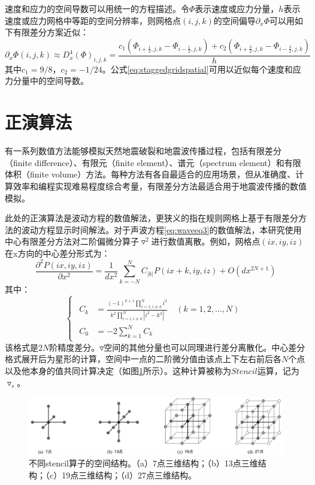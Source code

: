 \documentclass[degree=doctor]{thuthesis}
\begin{document}
速度和应力的空间导数可以用统一的方程描述。令$\Phi$表示速度或应力分量，$h$表示速度或应力网格中等距的空间分辨率，则网格点$(i,j,k)$的空间偏导$\partial_x \Phi$可以用如下有限差分方案近似：
\begin{equation}
  \partial_x \Phi(i,j,k) \approx D_x^4(\Phi)_{i,j,k} = \frac{c_1\left(\Phi_{i+\frac{1}{2},j,k} - \Phi_{i-\frac{1}{2},j,k}\right)+ c_2\left(\Phi_{i+\frac{3}{2},j,k} - \Phi_{i-\frac{3}{2},j,k}\right)}{h}
  \label{eq:staggedgridspatial}
\end{equation}
其中$c_1=9/8$，$c_2=-1/24$。公式\ref{eq:staggedgridspatial}可用以近似每个速度和应力分量中的空间导数。

\section{正演算法} %
有一系列数值方法能够模拟天然地震破裂和地震波传播过程，包括有限差分（finite difference）、有限元（finite element）、谱元（spectrum element）和有限体积（finite volume）方法。每种方法有各自最适合的应用场景，但从准确度、计算效率和编程实现难易程度综合考量，有限差分方法最适合用于地震波传播的数值模拟。

此处的正演算法是波动方程的数值解法，更狭义的指在规则网格上基于有限差分方法的波动方程显示时间解法。对于声波方程\ref{eq:waveeq3}的数值解法，本研究使用中心有限差分方法对二阶偏微分算子$\triangledown ^2$进行数值离散。例如，网格点$(ix, iy, iz)$在x方向的中心差分形式为：
\begin{equation}
  \frac{\partial ^2 P(ix, iy, iz)}{\partial x^2}=\frac{1}{dx^2}\sum_{k=-N}^N C_{|k|}P(ix+k, iy, iz)+O(dx^{2N+1})
\end{equation}
其中：
\begin{equation}
\left\{\begin{matrix}
\begin{aligned}
C_k &=\frac{(-1)^{k+1}\prod_{i=1,i\neq k}^N i^2}{k^2\prod_{i=i,i\neq k}^N |i^2-k^2|}\quad (k=1,2,\ldots,N) \\
C_0 &=-2\sum_{k=1}^N C_k  
\end{aligned}
\end{matrix}\right.
\end{equation}
该格式是$2N$阶精度差分。$\triangledown$空间的其他分量也可以同理进行差分离散化。中心差分格式展开后为星形的计算，空间中一点的二阶微分值由该点上下左右前后各$N$个点以及他本身的值共同计算决定（如图\ref{fig:stencilstruct}所示）。这种计算被称为$Stencil$运算，记为$\triangledown_s$。

\begin{figure}[ht]
  \centering
  \includegraphics[width=0.9\columnwidth]{stencil7131927.pdf}
  \caption{不同stencil算子的空间结构\cite{zhang2013autogeneration}。（a）7点三维结构；（b）13点三维结构；（c）19点三维结构；（d）27点三维结构。}
  \label{fig:stencilstruct}
\end{figure}
\end{document}
